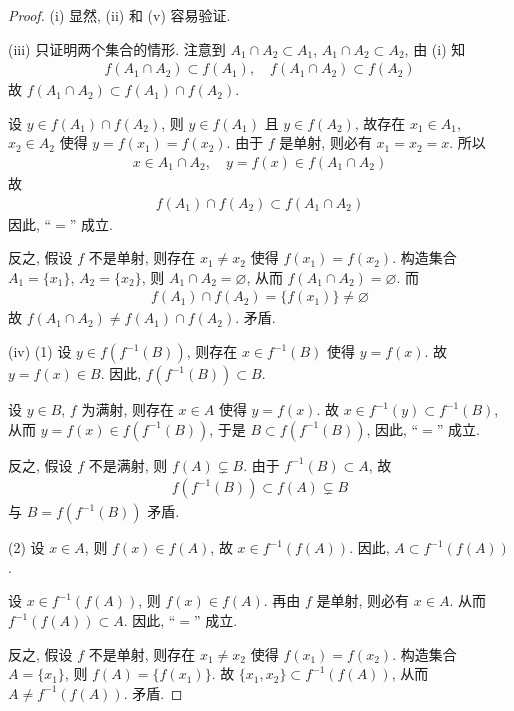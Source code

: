 \documentclass[../../main.tex]{subfiles}
\begin{document}
\begin{proof}
(i) 显然, (ii) 和 (v) 容易验证.

(iii) 只证明两个集合的情形. 注意到 $A_1 \cap A_2 \subset A_1$, $A_1 \cap A_2 \subset A_2$, 由 (i) 知
\begin{align*}
f(A_1 \cap A_2) \subset f(A_1), \quad f(A_1 \cap A_2) \subset f(A_2)
\end{align*}
故 $f(A_1 \cap A_2) \subset f(A_1) \cap f(A_2)$.

设 $y \in f(A_1) \cap f(A_2)$, 则 $y \in f(A_1)$ 且 $y \in f(A_2)$, 故存在 $x_1 \in A_1$, $x_2 \in A_2$ 使得 $y = f(x_1) = f(x_2)$. 由于 $f$ 是单射, 则必有 $x_1 = x_2 = x$. 所以
\begin{align*}
x \in A_1 \cap A_2, \quad y = f(x) \in f(A_1 \cap A_2)
\end{align*}
故
\begin{align*}
f(A_1) \cap f(A_2) \subset f(A_1 \cap A_2)
\end{align*}
因此, “$=$” 成立.

反之, 假设 $f$ 不是单射, 则存在 $x_1 \neq x_2$ 使得 $f(x_1) = f(x_2)$. 构造集合 $A_1 = \{x_1\}$, $A_2 = \{x_2\}$, 则 $A_1 \cap A_2 = \varnothing$, 从而 $f(A_1 \cap A_2) = \varnothing$. 而
\begin{align*}
f(A_1) \cap f(A_2) = \{f(x_1)\} \neq \varnothing
\end{align*}
故 $f(A_1 \cap A_2) \neq f(A_1) \cap f(A_2)$. 矛盾.

(iv) 
(1) 设 $y \in f(f^{-1}(B))$, 则存在 $x \in f^{-1}(B)$ 使得 $y = f(x)$. 故 $y = f(x) \in B$. 因此, $f(f^{-1}(B)) \subset B$.

设 $y \in B$, $f$ 为满射, 则存在 $x \in A$ 使得 $y = f(x)$. 故 $x \in f^{-1}(y) \subset f^{-1}(B)$, 从而 $y = f(x) \in f(f^{-1}(B))$, 于是 $B \subset f(f^{-1}(B))$, 因此, “$=$” 成立.

反之, 假设 $f$ 不是满射, 则 $f(A) \subsetneq B$. 由于 $f^{-1}(B) \subset A$, 故
\begin{align*}
f(f^{-1}(B)) \subset f(A) \subsetneq B
\end{align*}
与 $B = f(f^{-1}(B))$ 矛盾.

(2) 设 $x \in A$, 则 $f(x) \in f(A)$, 故 $x \in f^{-1}(f(A))$. 因此, $A \subset f^{-1}(f(A))$.

设 $x \in f^{-1}(f(A))$, 则 $f(x) \in f(A)$. 再由 $f$ 是单射, 则必有 $x \in A$. 从而 $f^{-1}(f(A)) \subset A$. 因此, “$=$” 成立.

反之, 假设 $f$ 不是单射, 则存在 $x_1 \neq x_2$ 使得 $f(x_1) = f(x_2)$. 构造集合 $A = \{x_1\}$, 则 $f(A) = \{f(x_1)\}$. 故 $\{x_1, x_2\} \subset f^{-1}(f(A))$, 从而 $A \neq f^{-1}(f(A))$. 矛盾. 
\end{proof}
\end{document}
